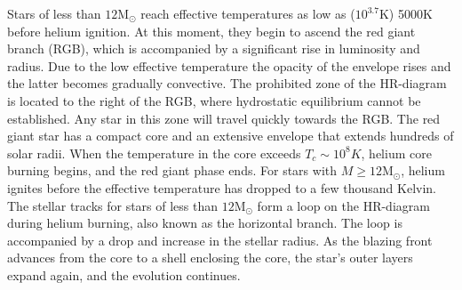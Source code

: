 Stars of less than $12$M$_{\odot}$ reach effective temperatures as low as ($10^{3.7}$K) 5000K before helium ignition. At this moment, they begin to ascend the red giant branch (RGB), which is accompanied by a significant rise in luminosity and radius. Due to the low effective temperature the opacity of the envelope rises and the latter becomes gradually convective. The prohibited zone of the HR-diagram is located to the right of the RGB, where hydrostatic equilibrium cannot be established. Any star in this zone will travel quickly towards the RGB. The red giant star has a compact core and an extensive envelope that extends hundreds of solar radii. When the temperature in the core exceeds $T_c \sim 10^8 K$, helium core burning begins, and the red giant phase ends. For stars with $M \geq 12$M$_{\odot}$, helium ignites before the effective temperature has dropped to a few thousand Kelvin. The stellar tracks for stars of less than $12$M$_{\odot}$ form a loop on the HR-diagram during helium burning, also known as the horizontal branch. The loop is accompanied by a drop and increase in the stellar radius. As the blazing front advances from the core to a shell enclosing the core, the star's outer layers expand again, and the evolution continues.

